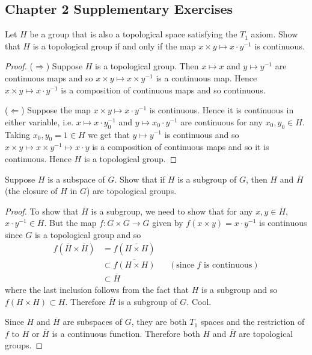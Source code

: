 \subsection{Chapter 2 Supplementary Exercises}
\begin{ex}{1}
    Let $H$ be a group that is also a topological space satisfying the $T_1$ axiom.
    Show that $H$ is a topological group if and only if the map $x\times y\mapsto x\cdot y^{-1}$ is continuous.
\end{ex}
\begin{proof}
    ($\Rightarrow$) Suppose $H$ is a topological group.
    Then $x\mapsto x$ and $y\mapsto y^{-1}$ are continuous maps and so $x\times y\mapsto x\times y^{-1}$ is a continuous map.
    Hence $x\times y\mapsto x\cdot y^{-1}$ is a composition of continuous maps and so continuous.

    ($\Leftarrow$) Suppose the map $x\times y\mapsto x\cdot y^{-1}$ is continuous. 
    Hence it is continuous in either variable, i.e. $x\mapsto x\cdot y_0^{-1}$ and $y\mapsto x_0\cdot y^{-1}$ are continuous for any $x_0, y_0\in H$.
    Taking $x_0,y_0=1\in H$ we get that $y\mapsto y^{-1}$ is continuous and so $x\times y\mapsto x\times y^{-1}\mapsto x\cdot y$ is a composition of continuous maps and so it is continuous.
    Hence $H$ is a topological group.
\end{proof}

\begin{ex}{3}
    Suppose $H$ is a subspace of $G$. Show that if $H$ is a subgroup of $G$, then $H$ and $\overline{H}$ (the closure of $H$ in $G$) are topological groups.
\end{ex}
\begin{proof}
    To show that $\overline{H}$ is a subgroup, we need to show that for any $x,y\in\overline{H}$, $x\cdot y^{-1}\in\overline{H}$.
    But the map $f:G\times G\to G$ given by $f(x\times y)=x\cdot y^{-1}$ is continuous since $G$ is a topological group and so
    \begin{align*}
        f(\overline{H}\times\overline{H})&=f(\overline{H\times H})\\
        &\subset\overline{f(H\times H)}&&(\text{since $f$ is continuous})\\
        &\subset\overline{H}
    \end{align*}
    where the last inclusion follows from the fact that $H$ is a subgroup and so $f(H\times H)\subset H$. 
    Therefore $\overline{H}$ is a subgroup of $G$. Cool.

    Since $H$ and $\overline{H}$ are subspaces of $G$, they are both $T_1$ spaces and the restriction of $f$ to $H$ or $\overline{H}$ is a continuous function.
    Therefore both $H$ and $\overline{H}$ are topological groups.
\end{proof}

